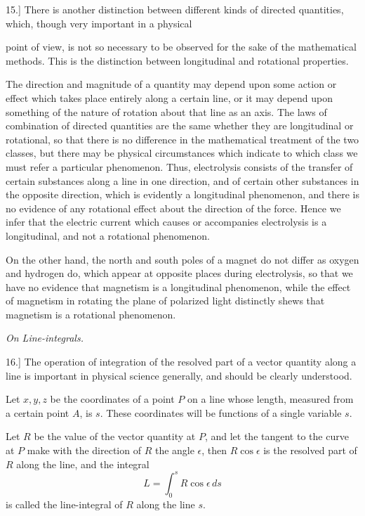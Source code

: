 \documentclass[11pt,a4paper]{article}
\begin{document}
15.] There is another distinction between different kinds of directed
quantities, which, though very important in a physical

\clearpage

point of view, is not so necessary to be observed for the sake of the
mathematical methods. This is the distinction between longitudinal and
rotational properties.

The direction and magnitude of a quantity may depend upon some action or
effect which takes place entirely along a certain line, or it may depend
upon something of the nature of rotation about that line as an axis. The
laws of combination of directed quantities are the same whether they are
longitudinal or rotational, so that there is no difference in the
mathematical treatment of the two classes, but there may be physical
circumstances which indicate to which class we must refer a particular
phenomenon. Thus, electrolysis consists of the transfer of certain
substances along a line in one direction, and of certain other
substances in the opposite direction, which is evidently a longitudinal
phenomenon, and there is no evidence of any rotational effect about the
direction of the force. Hence we infer that the electric current which
causes or accompanies electrolysis is a longitudinal, and not a
rotational phenomenon.

On the other hand, the north and south poles of a magnet do not differ
as oxygen and hydrogen do, which appear at opposite places during
electrolysis, so that we have no evidence that magnetism is a
longitudinal phenomenon, while the effect of magnetism in rotating the
plane of polarized light distinctly shews that magnetism is a rotational
phenomenon.

\begin{center}
\textit{On Line-integrals.}
\end{center}

16.] The operation of integration of the resolved part of a vector
quantity along a line is important in physical science generally, and
should be clearly understood.

Let \(x,y,z\) be the coordinates of a point \(P\) on a line whose
length, measured from a certain point \(A\), is \(s\). These coordinates
will be functions of a single variable \(s\).

Let \(R\) be the value of the vector quantity at \(P\), and let the
tangent to the curve at \(P\) make with the direction of \(R\) the angle
\(\epsilon\), then \(R\cos\epsilon\) is the resolved part of \(R\) along
the line, and the integral
\[
L=\int_0^s R\cos\epsilon\,ds
\]
is called the line-integral of \(R\) along the line \(s\).
\end{document}
